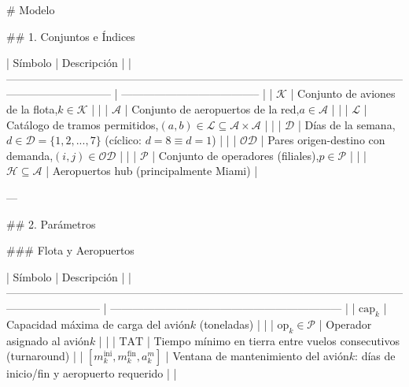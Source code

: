 # Modelo

## 1. Conjuntos e Índices

| Símbolo                                                                                                                                  | Descripción                           |
| ----------------------------------------------------------------------------------------------------------------------------------------- | -------------------------------------- |
| $\mathcal{K}$                       | Conjunto de aviones de la flota,$k \in \mathcal{K}$                                             |                                        |
| $\mathcal{A}$                       | Conjunto de aeropuertos de la red,$a \in \mathcal{A}$                                           |                                        |
| $\mathcal{L}$                       | Catálogo de tramos permitidos,$(a,b) \in \mathcal{L} \subseteq \mathcal{A} \times \mathcal{A}$ |                                        |
| $\mathcal{D}$                       | Días de la semana,$d \in \mathcal{D} = \{1,2,...,7\}$ (cíclico: $d=8 \equiv d=1$)           |                                        |
| $\mathcal{OD}$                      | Pares origen-destino con demanda,$(i,j) \in \mathcal{OD}$                                       |                                        |
| $\mathcal{P}$                       | Conjunto de operadores (filiales),$p \in \mathcal{P}$                                           |                                        |
| $\mathcal{H} \subseteq \mathcal{A}$                                                                                                     | Aeropuertos hub (principalmente Miami) |

---

## 2. Parámetros

### Flota y Aeropuertos

| Símbolo                                                                                                                               | Descripción                                                    |
| -------------------------------------------------------------------------------------------------------------------------------------- | --------------------------------------------------------------- |
| $\text{cap}_k$                                | Capacidad máxima de carga del avión$k$ (toneladas)                               |                                                                 |
| $\text{op}_k \in \mathcal{P}$                 | Operador asignado al avión$k$                                                     |                                                                 |
| $\text{TAT}$                                                                                                                         | Tiempo mínimo en tierra entre vuelos consecutivos (turnaround) |
| $[m_k^{\text{ini}}, m_k^{\text{fin}}, a_k^m]$ | Ventana de mantenimiento del avión$k$: días de inicio/fin y aeropuerto requerido |                                                                 |

